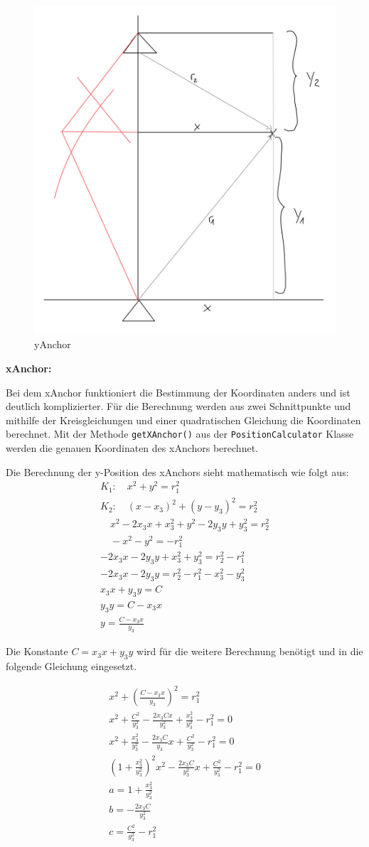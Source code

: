 \begin{figure}[H]
	\centering
	\includegraphics[width=0.4\linewidth]{images/yAnchor.jpeg}
	\caption[yAnchor]{yAnchor}
	\label{yAnchor}
\end{figure}

\newpage
\textbf{xAnchor:}

Bei dem xAnchor funktioniert die Bestimmung der Koordinaten anders und ist deutlich komplizierter. Für die Berechnung werden aus zwei Schnittpunkte und mithilfe der Kreisgleichungen und einer quadratischen Gleichung die Koordinaten berechnet. Mit der Methode \texttt{getXAnchor()} aus der \texttt{PositionCalculator} Klasse werden die genauen Koordinaten des xAnchors berechnet.

Die Berechnung der y-Position des xAnchors sieht mathematisch wie folgt aus:
\label{BerechnungXAnchor}
\begin{gather*}
	K_1: \quad x^2 + y^2 = r_{1}^{2} \\
	K_2: \quad (x - x_{3})^2 + (y - y_{3})^2 = r_{2}^{2} \\
	\quad x^2 - 2x_{3}x + x_{3}^{2} + y^2 - 2y_{3}y + y_{3}^{2} = r_{2}^{2} \\
	 \quad -x^2 - y^2 = -r_{1}^{2} \\
	-2x_{3}x - 2y_{3}y + x_{3}^{2} + y_{3}^{2} = r_{2}^{2} - r_{1}^{2} \\
	-2x_{3}x - 2y_{3}y = r_{2}^{2} - r_{1}^{2} - x_{3}^{2} - y_{3}^{2} \\
	x_{3}x + y_{3}y = C \\
	y_{3}y = C - x_{3}x \\
	y = \frac{C - x_{3}x}{y_{3}}
\end{gather*}

Die Konstante \texttt{\ensuremath{C= x_3 x + y_3 y}} wird für die weitere Berechnung benötigt und in die folgende Gleichung eingesetzt.

\begin{gather*}
	x^2 + \left( \frac{C - x_3 x}{y_3} \right)^2 = r_1^2 \\
	x^2 + \frac{C^2}{y_3^2} - \frac{2x_3 Cx}{y_3^2} + \frac{x_3^2}{y_3^2} - r_1^2 = 0 \\
	x^2 + \frac{x_3^2}{y_3^2} - \frac{2x_3 C}{y_3}x + \frac{C^2}{y_3^2} - r_1^2 = 0\\
	\left( 1 + \frac{x_3^2}{y_3^2} \right)^2x^2 - \frac{2x_3 C}{y_3^2}x + \frac{C^2}{y_3^2} - r_1^2 = 0 \\
	a = 1 + \frac{x_3^2}{y_3^2} \\
	b = -\frac{2x_3 C}{y_3^2} \\
	c = \frac{C^2}{y_3^2} - r_1^2
\end{gather*}


